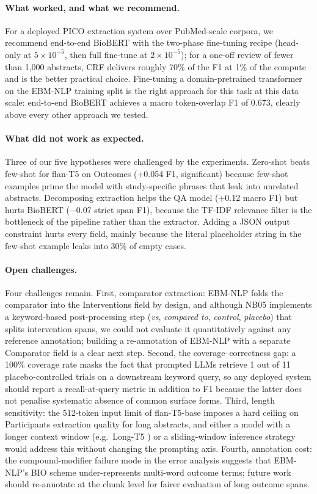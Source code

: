 \documentclass[11pt]{article}
\begin{document}
\paragraph{What worked, and what we recommend.} For a deployed PICO
extraction system over PubMed-scale corpora, we recommend end-to-end
BioBERT with the two-phase fine-tuning recipe (head-only at
$5\!\times\!10^{-5}$, then full fine-tune at $2\!\times\!10^{-5}$); for
a one-off review of fewer than 1{,}000 abstracts, CRF delivers roughly
70\% of the F1 at 1\% of the compute and is the better practical choice.
Fine-tuning a domain-pretrained transformer on the EBM-NLP training
split is the right approach for this task at this data scale: end-to-end
BioBERT achieves a macro token-overlap F1 of 0.673, clearly above every
other approach we tested.

\paragraph{What did not work as expected.} Three of our five hypotheses
were challenged by the experiments. Zero-shot beats few-shot for
flan-T5 on Outcomes ($+$0.054 F1, significant) because few-shot
examples prime the model with study-specific phrases that leak into
unrelated abstracts. Decomposing extraction helps the QA model
($+$0.12 macro F1) but hurts BioBERT ($-$0.07 strict span F1), because
the TF-IDF relevance filter is the bottleneck of the pipeline rather
than the extractor. Adding a JSON output constraint hurts every field,
mainly because the literal placeholder string in the few-shot example
leaks into 30\% of empty cases.

\paragraph{Open challenges.} Four challenges remain. First, comparator
extraction: EBM-NLP folds the comparator into the Interventions field
by design, and although NB05 implements a keyword-based post-processing
step (\textit{vs}, \textit{compared to}, \textit{control},
\textit{placebo}) that splits intervention spans, we could not evaluate
it quantitatively against any reference annotation; building a
re-annotation of EBM-NLP with a separate Comparator field is a clear
next step. Second, the coverage--correctness gap: a 100\% coverage
rate masks the fact that prompted LLMs retrieve 1 out of 11
placebo-controlled trials on a downstream keyword query, so any
deployed system should report a recall-at-query metric in addition to
F1 because the latter does not penalise systematic absence of common
surface forms. Third, length sensitivity: the 512-token input limit of
flan-T5-base imposes a hard ceiling on Participants extraction quality
for long abstracts, and either a model with a longer context window
(e.g.\ Long-T5 \citep{guo2022longt5}) or a sliding-window inference
strategy would address this without changing the prompting axis.
Fourth, annotation cost: the compound-modifier failure mode in the
error analysis suggests that EBM-NLP's BIO scheme under-represents
multi-word outcome terms; future work should re-annotate at the chunk
level for fairer evaluation of long outcome spans.
\end{document}
